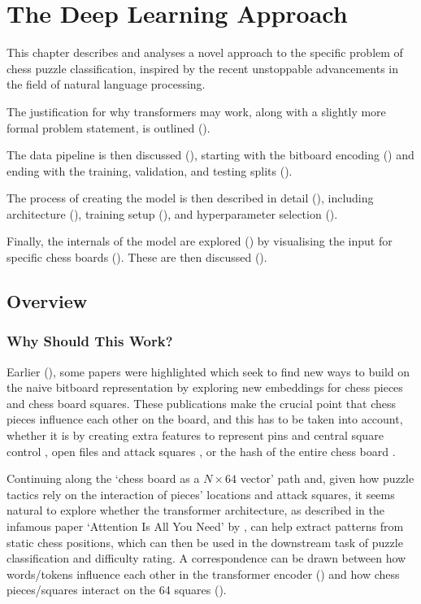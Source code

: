 \chapter{The Deep Learning Approach}\label{mlChapter}

This chapter describes and analyses a novel approach to the specific problem of
chess puzzle classification, inspired by the recent unstoppable advancements in
the field of natural language processing.

The justification for why transformers may work, along with a slightly more
formal problem statement, is outlined ().

The data pipeline is then discussed (), starting with the bitboard
encoding () and ending with the training, validation, and testing
splits ().

The process of creating the model is then described in detail (),
including architecture (), training setup (), and
hyperparameter selection ().

Finally, the internals of the model are explored () by visualising
the input for specific chess boards (). These are then discussed
().


\section{Overview}\label{mlS0}

\subsection{Why Should This Work?}

Earlier (), some papers were highlighted which seek to find new ways
to build on the naive bitboard representation by exploring new embeddings for
chess pieces and chess board squares. These publications make the crucial point
that chess pieces influence each other on the board, and this has to be taken
into account, whether it is by creating extra features to represent pins and
central square control \citep{chessCNN}, open files and attack squares
\citep{middleGamePatterns}, or the hash of the entire chess board
\cite{chess2vec}.

Continuing along the `chess board as a $N\times64$ vector' path and, given how
puzzle tactics rely on the interaction of pieces' locations and attack squares,
it seems natural to explore whether the transformer architecture, as described
in the infamous paper `Attention Is All You Need' by \citet{attention}, can
help extract patterns from static chess positions, which can then be used in
the downstream task of puzzle classification and difficulty rating. A
correspondence can be drawn between how words/tokens influence each other in
the transformer encoder () and how chess pieces/squares
interact on the 64 squares ().


